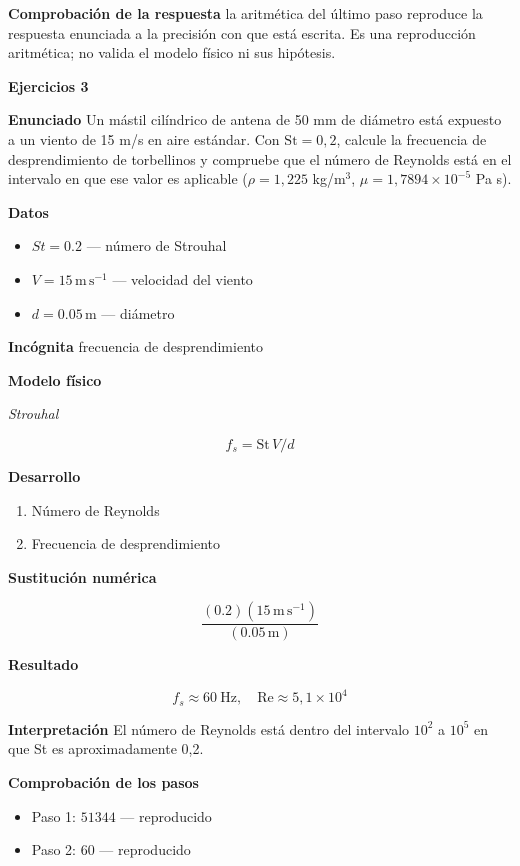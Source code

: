 \documentclass[10pt,openany]{book}
\begin{document}
\noindent\textbf{Comprobación de la respuesta} la aritmética del último paso reproduce la respuesta enunciada a la precisión con que está escrita. Es una reproducción aritmética; no valida el modelo físico ni sus hipótesis.

\noindent\textbf{Ejercicios 3}

\noindent\textbf{Enunciado}
Un mástil cilíndrico de antena de 50 mm de diámetro está expuesto a un viento de 15 m/s en aire estándar. Con \(\mathrm{St} = 0{,}2\), calcule la frecuencia de desprendimiento de torbellinos y compruebe que el número de Reynolds está en el intervalo en que ese valor es aplicable (\(\rho = 1{,}225\) kg/m\(^3\), \(\mu = 1{,}7894\times 10^{-5}\) Pa s).

\noindent\textbf{Datos}
\begin{itemize}
\item $St = 0.2$ — número de Strouhal
\item $V = 15\,\mathrm{m}\,\mathrm{s}^{-1}$ — velocidad del viento
\item $d = 0.05\,\mathrm{m}$ — diámetro
\end{itemize}

\noindent\textbf{Incógnita}
frecuencia de desprendimiento

\noindent\textbf{Modelo físico}

\noindent\textit{Strouhal}

\[
f_s = \mathrm{St}\,V/d
\]

\noindent\textbf{Desarrollo}
\begin{enumerate}
\item
Número de Reynolds
\item
Frecuencia de desprendimiento
\end{enumerate}

\noindent\textbf{Sustitución numérica}

\[
\frac{\left(0.2\right) \left(15\,\mathrm{m}\,\mathrm{s}^{-1}\right)}{\left(0.05\,\mathrm{m}\right)}
\]

\noindent\textbf{Resultado}

\[
f_s \approx 60\ \mathrm{Hz},\quad \mathrm{Re} \approx 5{,}1\times 10^{4}
\]

\noindent\textbf{Interpretación}
El número de Reynolds está dentro del intervalo \(10^2\) a \(10^5\) en que St es aproximadamente 0,2.

\noindent\textbf{Comprobación de los pasos}
\begin{itemize}
\item Paso 1: $51344$ — reproducido
\item Paso 2: $60$ — reproducido
\end{itemize}
\end{document}
